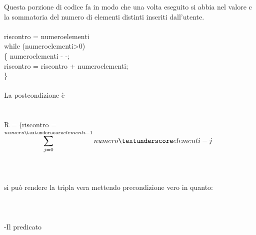 \documentclass[11pt, a4paper, titlepage, block]{article}
\begin{document}
Questa porzione di codice fa in modo che una volta eseguito si abbia nel valore c la sommatoria del numero di elementi distinti inseriti dall'utente.	
\\
\\
riscontro = numero\textunderscore elementi\\	
while (numero\textunderscore elementi\textgreater 0) \\
\{
numero\textunderscore elementi - -;\\
riscontro = riscontro + numero\textunderscore elementi;\\
\}
\\
\\
La postcondizione \`e 
\\
\\
\\
R =  (riscontro = $\displaystyle \sum_{j=0}^{numero\textunderscore elementi-1} numero\textunderscore elementi - j $\\
\\
\\
\\
si pu\`o rendere la tripla vera mettendo precondizione vero  in quanto:\\
\\
\\
\\
 -Il predicato
 
\end{document}

